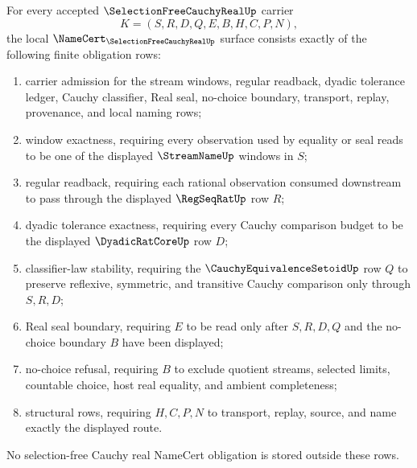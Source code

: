 \begin{theorem}
\label{thm:real-cauchy-selection-free-namecert-obligations}
For every accepted $\SelectionFreeCauchyRealUp$ carrier
$$
K=(S,R,D,Q,E,B,H,C,P,N),
$$
the local $\NameCert_{\SelectionFreeCauchyRealUp}$ surface consists exactly of the following finite obligation rows:
\begin{enumerate}
\item carrier admission for the stream windows, regular readback, dyadic tolerance ledger, Cauchy classifier, Real seal, no-choice boundary, transport, replay, provenance, and local naming rows;
\item window exactness, requiring every observation used by equality or seal reads to be one of the displayed $\StreamNameUp$ windows in $S$;
\item regular readback, requiring each rational observation consumed downstream to pass through the displayed $\RegSeqRatUp$ row $R$;
\item dyadic tolerance exactness, requiring every Cauchy comparison budget to be the displayed $\DyadicRatCoreUp$ row $D$;
\item classifier-law stability, requiring the $\CauchyEquivalenceSetoidUp$ row $Q$ to preserve reflexive, symmetric, and transitive Cauchy comparison only through $S,R,D$;
\item Real seal boundary, requiring $E$ to be read only after $S,R,D,Q$ and the no-choice boundary $B$ have been displayed;
\item no-choice refusal, requiring $B$ to exclude quotient streams, selected limits, countable choice, host real equality, and ambient completeness;
\item structural rows, requiring $H,C,P,N$ to transport, replay, source, and name exactly the displayed route.
\end{enumerate}
No selection-free Cauchy real NameCert obligation is stored outside these rows.
\end{theorem}
